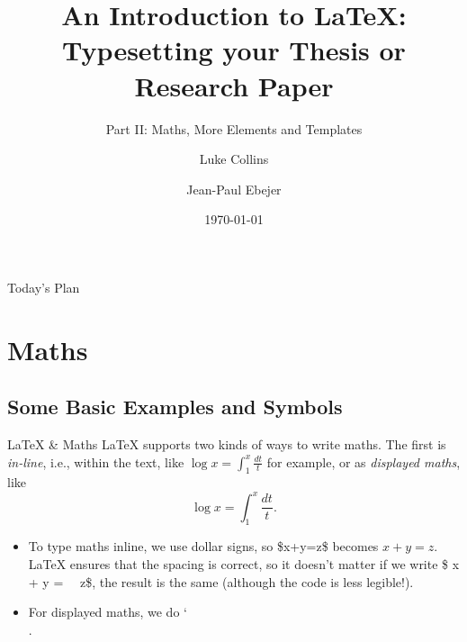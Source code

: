 \documentclass{beamer}
\title[Intro to \LaTeX{}: Part II]{An Introduction to \LaTeX{}:\\Typesetting your Thesis or Research Paper}
\subtitle{Part II: Maths, More Elements and Templates}
\author[L. Collins \& J.P.\ Ebejer]{Luke Collins \and Jean-Paul Ebejer}
\institute[UM]{
    Doctoral School\\
    University of Malta
}
\date{\myformat\today}
\begin{document}
    \frame{\titlepage}
   
    \begin{frame}{Today's Plan}
        \tableofcontents
    \end{frame}

    \section{Maths}
    \subsection{Some Basic Examples and Symbols}
    \begin{frame}{\LaTeX{} \& Maths}
        \LaTeX{} supports two kinds of ways to write maths. The first is \emph{in-line}, i.e., within the text, like $\log x=\int_1^x\frac{dt}t$ for example, or as \emph{displayed maths}, like
        \[\log x=\int_1^x\frac{dt}t.\]
        \begin{itemize}
            \item To type maths inline, we use dollar signs, so {\ttfamily\color{green!60!black}\$x+y=z\$} becomes $x+y=z$. \LaTeX{} ensures that the spacing is correct, so it doesn't matter if we write {\ttfamily\color{green!60!black}\$ x + y = \ \ z\$}, the result is the same (although the code is less legible!).
            
            \item For displayed maths, we do {\ttfamily\color{green!60!black}\char`\\[x+y=z\char`\\]}.
        \end{itemize} 
    \end{frame}
\end{document}
